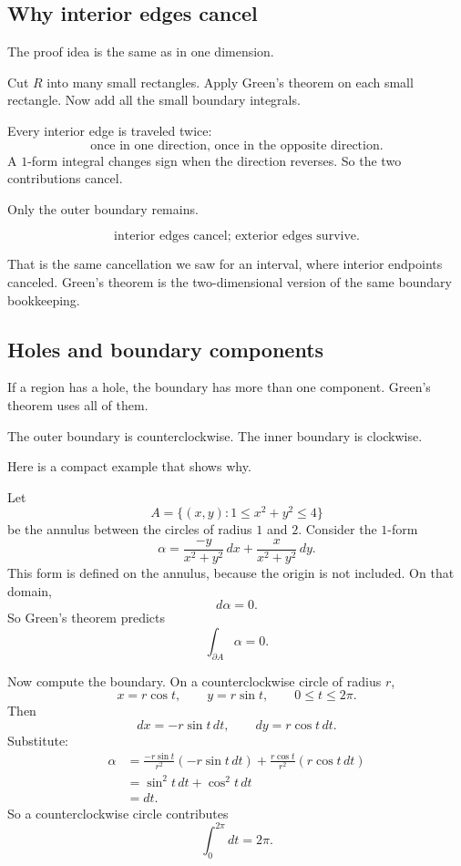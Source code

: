 \subsection{Why interior edges cancel}

The proof idea is the same as in one dimension.

Cut \(R\) into many small rectangles.  Apply Green's theorem on each small rectangle.
Now add all the small boundary integrals.

Every interior edge is traveled twice:
\[
    \text{once in one direction, once in the opposite direction.}
\]
A \(1\)-form integral changes sign when the direction reverses.  So the two
contributions cancel.

Only the outer boundary remains.

\[
\boxed{
    \text{interior edges cancel; exterior edges survive.}
}
\]

That is the same cancellation we saw for an interval, where interior endpoints canceled.
Green's theorem is the two-dimensional version of the same boundary bookkeeping.

\subsection{Holes and boundary components}

If a region has a hole, the boundary has more than one component.  Green's theorem
uses all of them.

The outer boundary is counterclockwise.  The inner boundary is clockwise.

Here is a compact example that shows why.

Let
\[
    A=\{(x,y):1\le x^2+y^2\le4\}
\]
be the annulus between the circles of radius \(1\) and \(2\).  Consider the \(1\)-form
\[
    \alpha=
    \frac{-y}{x^2+y^2}\,dx+
    \frac{x}{x^2+y^2}\,dy.
\]
This form is defined on the annulus, because the origin is not included.  On that
domain,
\[
    d\alpha=0.
\]
So Green's theorem predicts
\[
    \int_{\partial A}\alpha=0.
\]

Now compute the boundary.  On a counterclockwise circle of radius \(r\),
\[
    x=r\cos t,
    \qquad
    y=r\sin t,
    \qquad
    0\le t\le2\pi.
\]
Then
\[
    dx=-r\sin t\,dt,
    \qquad
    dy=r\cos t\,dt.
\]
Substitute:
\[
\begin{aligned}
    \alpha
    &=
    \frac{-r\sin t}{r^2}(-r\sin t\,dt)
    +
    \frac{r\cos t}{r^2}(r\cos t\,dt)\\
    &=
    \sin^2t\,dt+\cos^2t\,dt\\
    &=
    dt.
\end{aligned}
\]
So a counterclockwise circle contributes
\[
    \int_0^{2\pi}dt=2\pi.
\]

